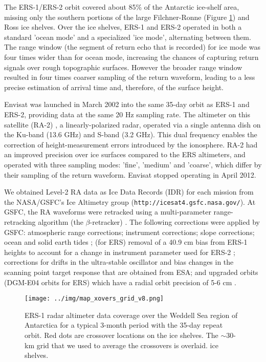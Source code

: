 The ERS-1/ERS-2 orbit covered about 85\% of the Antarctic ice-shelf area, missing only the southern portions of the large Filchner-Ronne (Figure \ref{c2f1}) and Ross ice shelves. Over the ice shelves, ERS-1 and ERS-2 operated in both a standard 'ocean mode' and a specialized 'ice mode', alternating between them. The range window (the segment of return echo that is recorded) for ice mode was four times wider than for ocean mode, increasing the chances of capturing return signals over rough topographic surfaces. However the broader range window resulted in four times coarser sampling of the return waveform, leading to a less precise estimation of arrival time and, therefore, of the surface height.

Envisat was launched in March 2002 into the same 35-day orbit as ERS-1 and ERS-2, providing data at the same 20 Hz sampling rate. The altimeter on this satellite (RA-2) \parencite{Roca2009}, a linearly-polarized radar, operated via a single antenna dish on the Ku-band (13.6 GHz) and S-band (3.2 GHz). This dual frequency enables the correction of height-measurement errors introduced by the ionosphere. RA-2 had an improved precision over ice surfaces compared to the ERS altimeters, and operated with three sampling modes: 'fine', 'medium' and 'coarse', which differ by their sampling of the return waveform. Envisat stopped operating in April 2012.

We obtained Level-2 RA data as Ice Data Records (IDR) for each mission from the NASA/GSFC's Ice Altimetry group ({\tt http://icesat4.gsfc.nasa.gov/}). At GSFC, the RA waveforms were retracked using a multi-parameter range-retracking algorithm (the $\beta$-retracker) \parencite{Martin1983}. The following corrections were applied by GSFC: atmospheric range corrections; instrument corrections; slope corrections; ocean and solid earth tides \parencite{Brenner1983, Zwally2001, Zwally2005}; (for ERS) removal of a 40.9 cm bias from ERS-1 heights to account for a change in instrument parameter used for ERS-2 \parencite{Femenias1996}; corrections for drifts in the ultra-stable oscillator and bias changes in the scanning point target response that are obtained from ESA; and upgraded orbits (DGM-E04 orbits for ERS) which have a radial orbit precision of 5-6 cm \parencite{Scharroo1998}.


\begin{figure}[!ht]
  \texttt{[image: ../img/map\_xovers\_grid\_v8.png]}
  \caption{ERS-1 radar altimeter data coverage over the Weddell Sea region of Antarctica for a typical 3-month period with the 35-day repeat orbit. Red dots are crossover locations on the ice shelves. The $\sim$30-km grid that we used to average the crossovers is overlaid. 
  ice shelves.} 
  \label{c2f1}
\end{figure}


